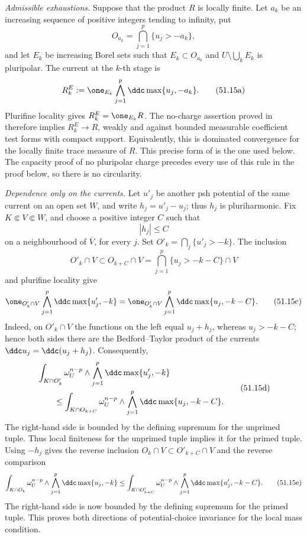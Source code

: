 \emph{Admissible exhaustions.}  Suppose that the product \(R\) is locally
finite.  Let \(a_k\) be an increasing sequence of positive integers tending
to infinity, put
\[
 O_{a_k}=\bigcap_{j=1}^p\{u_j>-a_k\},
\]
and let \(E_k\) be increasing Borel sets such that
\(E_k\subset O_{a_k}\) and
\(U\setminus\bigcup_kE_k\) is pluripolar.  The current at the \(k\)-th
stage is
\[
 R_k^{E}:=\one_{E_k}\bigwedge_{j=1}^p
                    \ddc\max\{u_j,-a_k\}.
\tag{51.15a}\label{eq:complex-npp-admissible-exhaustion}
\]
Plurifine locality gives \(R_k^{E}=\one_{E_k}R\).  The no-charge assertion
proved in  therefore implies
\(R_k^{E}\to R\), weakly and against bounded measurable coefficient test
forms with compact support.  Equivalently, this is dominated convergence for
the locally finite trace measure of \(R\).  This precise form of
\cite[Lemma~1.5]{BEGZ10} is the one used below.  The capacity proof of no
pluripolar charge precedes every use of this rule in the proof below, so there
is no circularity.

\emph{Dependence only on the currents.}  Let \(u'_j\) be another psh
potential of the same current on an open set \(W\), and write
\(h_j=u'_j-u_j\); thus \(h_j\) is pluriharmonic.  Fix
\(K\Subset V\Subset W\), and choose a positive integer \(C\) such that
\[
                         |h_j|\leq C
\]
on a neighbourhood of \(\overline V\), for every \(j\).  Set
\(O'_k=\bigcap_j\{u'_j>-k\}\).  The inclusion
\[
 O'_k\cap V\subset O_{k+C}\cap V
       =\bigcap_{j=1}^p\{u_j>-k-C\}\cap V
\tag{51.15b}\label{eq:complex-npp-potential-locus-forward}
\]
and plurifine locality give
\[
 \one_{O'_k\cap V}\bigwedge_{j=1}^p\ddc\max\{u'_j,-k\}
 =\one_{O'_k\cap V}\bigwedge_{j=1}^p\ddc\max\{u_j,-k-C\}.
\tag{51.15c}\label{eq:complex-npp-potential-current-forward}
\]
Indeed, on \(O'_k\cap V\) the functions on the left equal \(u_j+h_j\),
whereas \(u_j>-k-C\); hence both sides there are the Bedford--Taylor product
of the currents \(\ddc u_j=\ddc(u_j+h_j)\).  Consequently,
\[
\begin{aligned}
 &\int_{K\cap O'_k}\omega_U^{n-p}\wedge
       \bigwedge_{j=1}^p\ddc\max\{u'_j,-k\}\\
 &\qquad\leq
 \int_{K\cap O_{k+C}}\omega_U^{n-p}\wedge
       \bigwedge_{j=1}^p\ddc\max\{u_j,-k-C\}.
\end{aligned}
\tag{51.15d}\label{eq:complex-npp-potential-mass-forward}
\]
The right-hand side is bounded by the defining supremum for the unprimed
tuple.  Thus local finiteness for the unprimed tuple implies it for the
primed tuple.  Using \(-h_j\) gives the reverse inclusion
\(O_k\cap V\subset O'_{k+C}\cap V\) and the reverse comparison
\[
 \int_{K\cap O_k}\omega_U^{n-p}\wedge
       \bigwedge_{j=1}^p\ddc\max\{u_j,-k\}
 \leq
 \int_{K\cap O'_{k+C}}\omega_U^{n-p}\wedge
       \bigwedge_{j=1}^p\ddc\max\{u'_j,-k-C\}.
\tag{51.15e}\label{eq:complex-npp-potential-mass-reverse}
\]
The right-hand side is now bounded by the defining supremum for the primed
tuple.  This proves both directions of potential-choice invariance for the
local mass condition.

